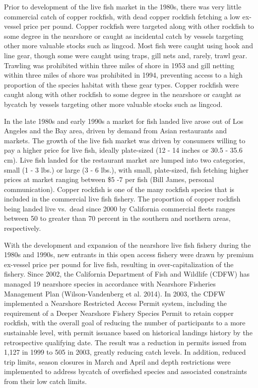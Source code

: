 \documentclass[11pt,
  english,
  letterpaper,
]{article}
\begin{document}
Prior to development of the live fish market in the 1980s, there was very little commercial catch of copper rockfish, with dead copper rockfish fetching a low ex-vessel price per pound. Copper rockfish were targeted along with other rockfish to some degree in the nearshore or caught as incidental catch by vessels targeting other more valuable stocks such as lingcod. Most fish were caught using hook and line gear, though some were caught using traps, gill nets and, rarely, trawl gear. Trawling was prohibited within three miles of shore in 1953 and gill netting within three miles of shore was prohibited in 1994, preventing access to a high proportion of the species habitat with these gear types. Copper rockfish were caught along with other rockfish to some degree in the nearshore or caught as bycatch by vessels targeting other more valuable stocks such as lingcod.

In the late 1980s and early 1990s a market for fish landed live arose out of Los Angeles and the Bay area, driven by demand from Asian restaurants and markets. The growth of the live fish market was driven by consumers willing to pay a higher price for live fish, ideally plate-sized (12 - 14 inches or 30.5 - 35.6 cm). Live fish landed for the restaurant market are lumped into two categories, small (1 - 3 lbs.) or large (3 - 6 lbs.), with small, plate-sized, fish fetching higher prices at market ranging between \$5 -7 per fish (Bill James, personal communication). Copper rockfish is one of the many rockfish species that is included in the commercial live fish fishery. The proportion of copper rockfish being landed live vs.~dead since 2000 by California commercial fleets ranges between 50 to greater than 70 percent in the southern and northern areas, respectively.

With the development and expansion of the nearshore live fish fishery during the 1980s and 1990s, new entrants in this open access fishery were drawn by premium ex-vessel price per pound for live fish, resulting in over-capitalization of the fishery. Since 2002, the California Department of Fish and Wildlife (CDFW) has managed 19 nearshore species in accordance with Nearshore Fisheries Management Plan (Wilson-Vandenberg et al. 2014). In 2003, the CDFW implemented a Nearshore Restricted Access Permit system, including the requirement of a Deeper Nearshore Fishery Species Permit to retain copper rockfish, with the overall goal of reducing the number of participants to a more sustainable level, with permit issuance based on historical landings history by the retrospective qualifying date. The result was a reduction in permits issued from 1,127 in 1999 to 505 in 2003, greatly reducing catch levels. In addition, reduced trip limits, season closures in March and April and depth restrictions were implemented to address bycatch of overfished species and associated constraints from their low catch limits.
\end{document}
